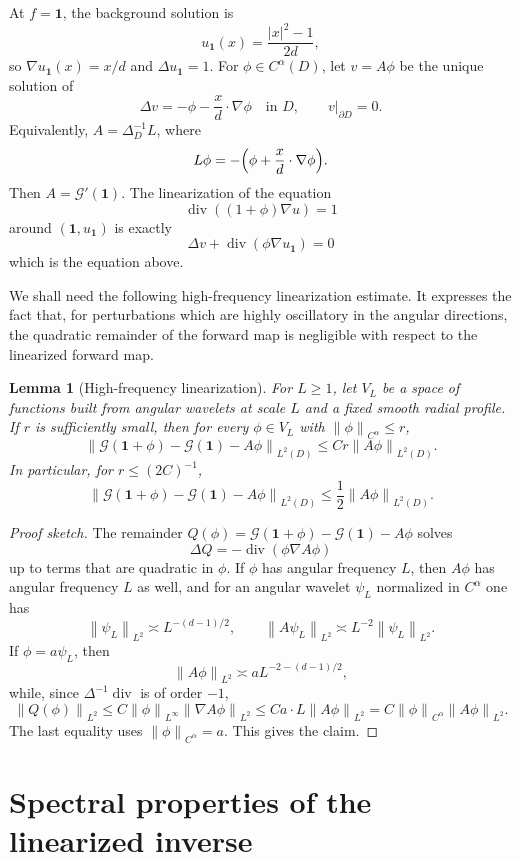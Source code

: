 \documentclass{article}
\newtheorem{lemma}[theorem]{Lemma}
\theoremstyle{remark}
\newcommand{\cG}{\mathcal G}
\newcommand{\norm}[1]{\left\|#1\right\|}
\newcommand{\one}{\mathbf 1}
\begin{document}
At \(f=\one\), the background solution is
\[
u_\one(x)=\frac{|x|^2-1}{2d},
\]
so \(\nabla u_\one(x)=x/d\) and \(\Delta u_\one=1\). For \(\phi\in C^\alpha(D)\), let \(v=A\phi\) be the unique solution of
\[
\Delta v=-\phi-\frac{x}{d}\cdot \nabla \phi\quad \text{in }D,\qquad v|_{\partial D}=0.
\]
Equivalently, \(A=\Delta_D^{-1} L\), where
\[
L\phi=-\Bigl(\phi+\frac{x}{d}\cdot \nabla \phi\Bigr).
\]
Then \(A=\cG'(\one)\). The linearization of the equation
\[
\operatorname{div}((1+\phi)\nabla u)=1
\]
around \((\one,u_\one)\) is exactly
\[
\Delta v+\operatorname{div}(\phi\nabla u_\one)=0
\]
which is the equation above.

We shall need the following high-frequency linearization estimate. It expresses the fact that, for perturbations which are highly oscillatory in the angular directions, the quadratic remainder of the forward map is negligible with respect to the linearized forward map.

\begin{lemma}[High-frequency linearization]\label{lem:hf-lin}
For \(L\ge 1\), let \(V_L\) be a space of functions built from angular wavelets at scale \(L\) and a fixed smooth radial profile. If \(r\) is sufficiently small, then for every \(\phi\in V_L\) with \(\norm{\phi}_{C^\alpha}\le r\),
\[
\norm{\cG(\one+\phi)-\cG(\one)-A\phi}_{L^2(D)}
\le C r \norm{A\phi}_{L^2(D)}.
\]
In particular, for \(r\le (2C)^{-1}\),
\[
\norm{\cG(\one+\phi)-\cG(\one)-A\phi}_{L^2(D)}
\le \frac12 \norm{A\phi}_{L^2(D)}.
\]
\end{lemma}

\begin{proof}[Proof sketch]
The remainder \(Q(\phi)=\cG(\one+\phi)-\cG(\one)-A\phi\) solves
\[
\Delta Q=-\operatorname{div}(\phi\nabla A\phi)
\]
up to terms that are quadratic in \(\phi\). If \(\phi\) has angular frequency \(L\), then \(A\phi\) has angular frequency \(L\) as well, and for an angular wavelet \(\psi_L\) normalized in \(C^\alpha\) one has
\[
\norm{\psi_L}_{L^2}\asymp L^{-(d-1)/2},\qquad
\norm{A\psi_L}_{L^2}\asymp L^{-2}\norm{\psi_L}_{L^2}.
\]
If \(\phi=a\psi_L\), then
\[
\norm{A\phi}_{L^2}\asymp a L^{-2-(d-1)/2},
\]
while, since \(\Delta^{-1}\operatorname{div}\) is of order \(-1\),
\[
\norm{Q(\phi)}_{L^2}
\le C \norm{\phi}_{L^\infty}\norm{\nabla A\phi}_{L^2}
\le C a\cdot L\norm{A\phi}_{L^2}
= C\norm{\phi}_{C^\alpha}\norm{A\phi}_{L^2}.
\]
The last equality uses \(\norm{\phi}_{C^\alpha}=a\). This gives the claim.
\end{proof}

\section{Spectral properties of the linearized inverse}
\end{document}
